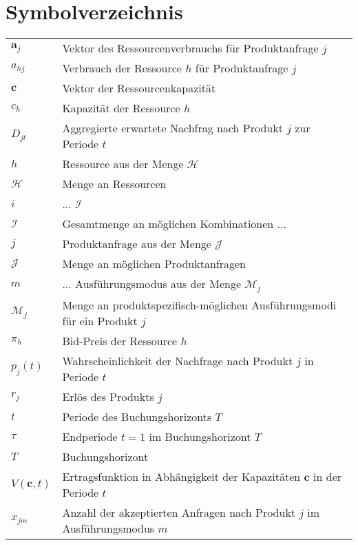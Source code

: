 \documentclass[a4paper,12pt,normalheadings,footexclude,headinclude,liststotoc,nochapterprefix,onecolumn,oneside,parskip,pointlessnumbers]{scrreprt}
\begin{document}
\chapter*{Symbolverzeichnis}
\begin{table}[h!]
    \vspace*{-3mm}
    \hspace*{2mm}
  \renewcommand{\arraystretch}{1,5}
  \begin{flushleft}
    \begin{tabular}{lp{11.5cm}}  %
    $\textbf{a}_{j}$ & Vektor des Ressourcenverbrauchs für Produktanfrage $j$\\
    $a_{hj}$ &	Verbrauch der Ressource $h$ für Produktanfrage $j$\\
   $\textbf{c}$ & Vektor der Ressourcenkapazität\\
   $c_{h}$ & Kapazität der Ressource $h$\\
    $D_{jt}$ & Aggregierte erwartete Nachfrag nach Produkt $j$ zur Periode $t$\\
    $h$	& Ressource aus der Menge $\mathcal{H}$\\
    $\mathcal{H}$ & Menge an Ressourcen\\
    $i$ & ... $\mathcal{I}$\\
    $\mathcal{I}$ & Gesamtmenge an möglichen Kombinationen ...\\
    $j$ & Produktanfrage aus der Menge $\mathcal{J}$\\
$\mathcal{J}$ & Menge an möglichen Produktanfragen \\   
$m$ & ... Ausführungsmodus aus der Menge $\mathcal{M}_{j}$\\
    $\mathcal{M}_{j}$ & Menge an produktspezifisch-möglichen Ausführungsmodi für ein Produkt $j$\\
 $\pi_{h}$ & Bid-Preis der Ressource $h$\\
   $p_{j}(t)$ & Wahrscheinlichkeit der Nachfrage nach Produkt $j$ in Periode $t$\\
    $r_{j}$ & Erlös des Produkts $j$\\
    $t$ & Periode des Buchungshorizonts $T$\\
        $\tau$ & Endperiode $t=1$ im Buchungshorizont $T$\\ 
        $T$ & Buchungshorizont\\
   $V(\textbf{c},t)$ & Ertragsfunktion in Abhängigkeit der Kapazitäten $\textbf{c}$ in der Periode $t$\\
    $x_{jm}$ & Anzahl der akzeptierten Anfragen nach Produkt $j$ im Ausführungsmodus $m$\\
	\end{tabular}
	\end{flushleft}
\end{table}
\end{document}
